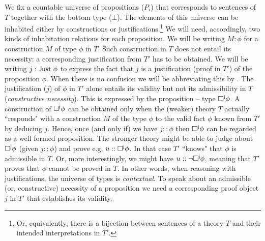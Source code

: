 \documentclass[11pt]{eptcs} %
\begin{document}

 
We fix a countable universe of propositions ($P_i$) that corresponds to  sentences of $T$ together with the bottom type ($\bot$). The elements of this universe can be inhabited either by constructions or justifications.\footnote{Or, equivalently, there is a bijection 
between  sentences of  a theory $T$ and their intended interpretations  in $T'$.} We  will need, accordingly, two kinds of inhabitation relations for each proposition. We will be writing $M:\phi$ for a construction $M$ of type $\phi$ in $T$. Such construction in $T$ does not entail its necessity: a corresponding justification from $T'$ has to be obtained. We will be writing {$j: {\sf  Just}\  \phi$}  to express the fact that  {$j$} is a justification (proof in $T'$) of the proposition $\phi$. When there is no confusion we will be abbreviating this by {}. The justification ($j$) of $\phi$ in $T'$ alone entails its validity but not its admissibility in $T$ (\textit{constructive  necessity}). 
This is expressed by the proposition -- type ${\sf \Box^{j}\phi}$. 
%
A construction of ${\sf \Box^{j}\phi}$ can be obtained only when the (weaker) theory $T$ actually ``responds" with a construction $M$ of the type $\phi$ to the valid fact $\phi$ known from $T'$ by deducing $j$. 
%
Hence, once (and only if) we have $j:: \phi$ then ${\sf\Box^{j}\phi}$ can be regarded as a well formed proposition. The  stronger theory might be able to judge about ${\sf\Box^{j}\phi}$ (given $j::\phi$) and prove e.g, $u::{\sf\Box^{j}\phi}$. In that case $T'$ ``knows"  that $\phi$ is admissible in $T$. Or, more interestingly, we might have $u::{\sf\neg \Box^{j}\phi}$, meaning that $T'$ proves that  $\phi$ cannot be proved in $T$. In other words, when reasoning with justifications, the universe of types  is \textit{contextual}. To speak about  an admissible (or, constructive) necessity of a proposition we need a corresponding proof object $j$ in $T'$ that establishes its validity. 
\end{document}
